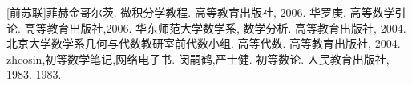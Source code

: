 
\begin{thebibliography}{99}
    [前苏联]菲赫金哥尔茨. 微积分学教程. 高等教育出版社, 2006.
   华罗庚. 高等数学引论. 高等教育出版社,2006.
    华东师范大学数学系, 数学分析. 高等教育出版社, 2004.
    北京大学数学系几何与代数教研室前代数小组. 高等代数. 高等教育出版社, 2004.
   zhcosin,初等数学笔记,网络电子书.
    闵嗣鹤,严士健. 初等数论. 人民教育出版社, 1983. 1983.
\end{thebibliography}



